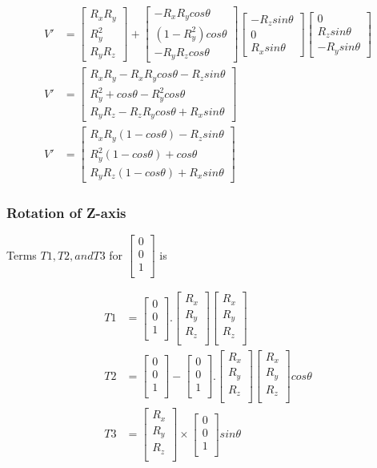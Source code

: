 \documentclass{article}
\newcommand{\zaxis}{
    \begin{bmatrix}
        0 \\
        0 \\
        1 \\
    \end{bmatrix}
}
\newcommand{\rotAxis}{
    \begin{bmatrix}
        R_x \\
        R_y \\
        R_z \\
    \end{bmatrix}
}
\newcommand{\vparallelForZ}{
    \zaxis . \rotAxis 
    \rotAxis
}
\begin{document}
    \begin{align}
        V' &= 
        \begin{bmatrix} R_xR_y \\ R_y^2 \\ R_yR_z \end{bmatrix} +  
        \begin{bmatrix} -R_xR_ycos\theta \\ (1-R_y^2)cos\theta \\ -R_yR_zcos\theta \end{bmatrix}
        \begin{bmatrix} -R_zsin\theta \\ 0 \\ R_xsin\theta \end{bmatrix}
        \begin{bmatrix} 0 \\ R_zsin\theta \\ -R_ysin\theta \end{bmatrix} \\
        V' &= 
        \begin{bmatrix}
            R_xR_y - R_xR_ycos\theta -R_zsin\theta \\ 
            R_y^2 + cos\theta -R_y^2cos\theta \\ 
            R_yR_z - R_zR_ycos\theta + R_xsin\theta  
        \end{bmatrix} \\
        V' &= 
        \begin{bmatrix}
            R_xR_y(1 - cos\theta) - R_zsin\theta \\ 
            R_y^2(1 - cos\theta) + cos\theta \\ 
            R_yR_z(1 - cos\theta) + R_xsin\theta  
        \end{bmatrix} \label{eq:yaxisAfterRotation}
    \end{align}

    \subsubsection*{Rotation of Z-axis}

    Terms $T1,T2, and T3$ for $\zaxis$ is 

    \begin{align}
        T1 &= \vparallelForZ \\
        T2 &= \zaxis - \vparallelForZ cos\theta \\
        T3 &= \rotAxis \times \zaxis sin\theta 
    \end{align}
\end{document}
